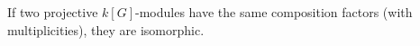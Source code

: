 If two projective $k[G]$-modules have the same composition factors (with multiplicities), they are isomorphic.
